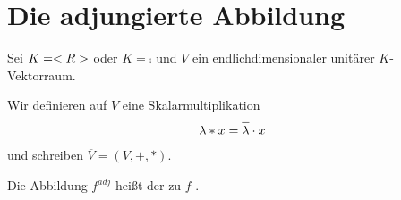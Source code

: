 \section{Die adjungierte Abbildung}

Sei $K=<R>$ oder $K=\comp$ und $V$ ein endlichdimensionaler unitärer $K$-Vektorraum.

\begin{definition}
	Wir definieren auf $V$ eine Skalarmultiplikation
	\begin{align}
		\lambda\ast x=\overline{\lambda}\cdot x\notag
	\end{align}
	und schreiben $\overline{V}=(V,+,\ast)$.
\end{definition}

\begin{definition}
	Die Abbildung $f^{adj}$ heißt der zu $f$ .
\end{definition}